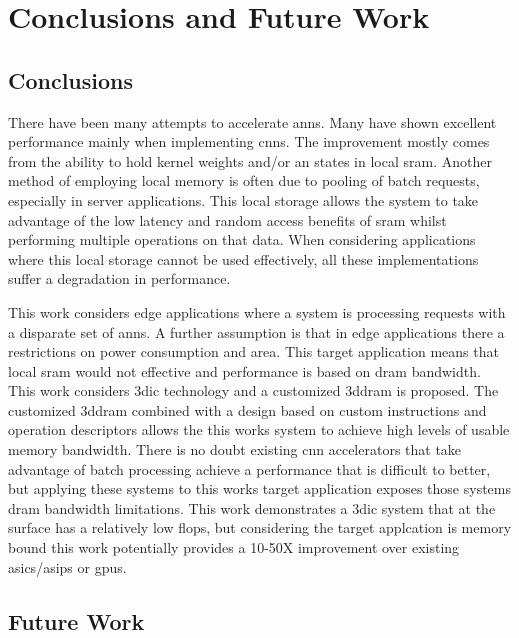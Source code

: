 
\chapter{Conclusions and Future Work}
\label{sec:Conclusions and Future Work}
\label{sec:chap-seven}

\section[Conclusions]{Conclusions}
\label{sec:Conclusions}

There have been many attempts to accelerate \acp{ann}. Many have shown excellent performance mainly when implementing \acp{cnn}. The improvement mostly comes from the ability to hold kernel weights and/or \ac{an} states in local \ac{sram}. 
Another method of employing local memory is often due to pooling of batch requests, especially in server applications.
This local storage allows the system to take advantage of the low latency and random access benefits of \ac{sram} whilst performing multiple operations on that data.
When considering applications where this local storage cannot be used effectively, all these implementations suffer a degradation in performance.

This work considers edge applications where a system is processing requests with a disparate set of \acp{ann}. 
A further assumption is that in edge applications there a restrictions on power consumption and area.
This target application means that local \ac{sram} would not effective and performance is based on \ac{dram} bandwidth.
This work considers \acf{3dic} technology and a customized \acf{3ddram} is proposed. 
The customized \ac{3ddram} combined with a design based on custom instructions and operation descriptors allows the this works system to achieve high levels of usable memory bandwidth.
There is no doubt existing \ac{cnn} accelerators that take advantage of batch processing achieve a performance that is difficult to better, but applying these systems to this works target application exposes those systems \ac{dram} bandwidth limitations.
This work demonstrates a \ac{3dic} system that at the surface has a relatively low \ac{flops}, but considering the target applcation is memory bound this work potentially provides a 10-50X improvement over existing \acp{asic}/\acp{asip} or \acp{gpu}.
\iffalse
given the target application, provides a potentially 10-50X performance improvement over existing ASIC/ASIPs or GPUs.
\fi

\section[Future Work]{Future Work}
\label{sec:Future Work}

